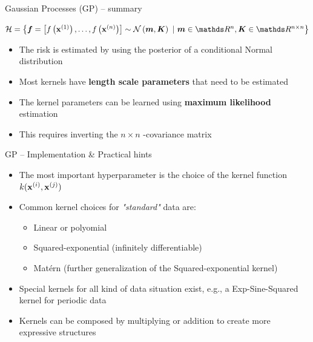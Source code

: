 
\begin{frame}{Gaussian Processes (GP) -- summary}
    
    \medskip
    $\Hspace = \left\{ \bm{f} = \left[f\left(\xi[1]\right), \dots, f\left(\xi[n]\right)\right] \sim \mathcal{N}\left(\bm{m}, \bm{K}\right) ~|~ \bm{m} \in \R^n, \bm{K} \in \R^{n\times n} \right\}$

    \medskip
    \begin{itemize}
        \item The risk is estimated by using the posterior of a conditional Normal distribution
        \item Most kernels have \textbf{length scale parameters} that need to be estimated
    \end{itemize}
    \begin{itemize}
        \item The kernel parameters can be learned using \textbf{maximum likelihood} estimation
        \item This requires inverting the $n\times n$ -covariance matrix
    \end{itemize}
\end{frame}


\begin{frame}{GP -- Implementation \& Practical hints}
    \begin{itemize}
        \item The most important hyperparameter is the choice of the kernel function $k(\mathbf{x}^{(i)}, \mathbf{x}^{(j)})$
        \item Common kernel choices for \textit{"standard"} data are:
        \begin{itemize}
            \item Linear or polyomial
            \item Squared-exponential (infinitely differentiable)
            \item Matérn (further generalization of the Squared-exponential kernel)
        \end{itemize}
        \item Special kernels for all kind of data situation exist, e.g., a Exp-Sine-Squared kernel for periodic data
        \item Kernels can be composed by multiplying or addition to create more expressive structures
    \end{itemize}


\end{frame}

